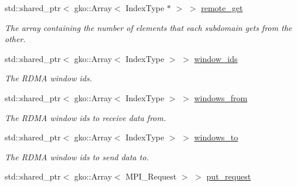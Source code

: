 \begin{DoxyCompactItemize}
std\+::shared\+\_\+ptr$<$ gko\+::\+Array$<$ Index\+Type $\ast$ $>$ $>$ \hyperlink{structschwz_1_1Communicate_1_1comm__struct_a70f57e5c0ab445089ca9d8bdc0fa3838}{remote\+\_\+get}
\begin{DoxyCompactList}\small\item\em The array containing the number of elements that each subdomain gets from the other. \end{DoxyCompactList}\item 
\mbox{\label{structschwz_1_1Communicate_1_1comm__struct_a179dd67dc2d6ea4b71a6d5964cac18c6}} 
std\+::shared\+\_\+ptr$<$ gko\+::\+Array$<$ Index\+Type $>$ $>$ \hyperlink{structschwz_1_1Communicate_1_1comm__struct_a179dd67dc2d6ea4b71a6d5964cac18c6}{window\+\_\+ids}
\begin{DoxyCompactList}\small\item\em The R\+D\+MA window ids. \end{DoxyCompactList}\item 
\mbox{\label{structschwz_1_1Communicate_1_1comm__struct_a167c62a1a0cf2be8351e1ab65a264cf2}} 
std\+::shared\+\_\+ptr$<$ gko\+::\+Array$<$ Index\+Type $>$ $>$ \hyperlink{structschwz_1_1Communicate_1_1comm__struct_a167c62a1a0cf2be8351e1ab65a264cf2}{windows\+\_\+from}
\begin{DoxyCompactList}\small\item\em The R\+D\+MA window ids to receive data from. \end{DoxyCompactList}\item 
\mbox{\label{structschwz_1_1Communicate_1_1comm__struct_aef866f16ced557ba1496cffaf7c2473e}} 
std\+::shared\+\_\+ptr$<$ gko\+::\+Array$<$ Index\+Type $>$ $>$ \hyperlink{structschwz_1_1Communicate_1_1comm__struct_aef866f16ced557ba1496cffaf7c2473e}{windows\+\_\+to}
\begin{DoxyCompactList}\small\item\em The R\+D\+MA window ids to send data to. \end{DoxyCompactList}\item 
\mbox{\label{structschwz_1_1Communicate_1_1comm__struct_a9f135d4c33838027f8ed64a3ee18d42f}} 
std\+::shared\+\_\+ptr$<$ gko\+::\+Array$<$ M\+P\+I\+\_\+\+Request $>$ $>$ \hyperlink{structschwz_1_1Communicate_1_1comm__struct_a9f135d4c33838027f8ed64a3ee18d42f}{put\+\_\+request}

\end{DoxyCompactItemize}
